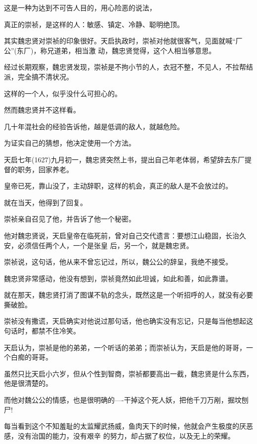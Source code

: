 \documentclass[11pt,a4paper,onecolumn]{article}
\begin{document}
这是一种为达到不可告人目的，用心险恶的说法，

真正的崇祯，是这样的人：敏感、镇定、冷静、聪明绝顶。

其实魏忠贤对崇祯的印象很好。天启执政时，崇祯对他就很客气，见面就喊``厂公''(东厂)，称兄道弟，相当激
动，魏忠贤觉得，这个人相当够意思。

经过长期观察，魏忠贤发现，崇祯是不拘小节的人，衣冠不整，不见人，不拉帮结派，完全搞不清状况。

这样的一个人，似乎没什么可担心的。

然而魏忠贤并不这样看。

几十年混社会的经验告诉他，越是低调的敌人，就越危险。

为证实自己的猜想，他决定使用一个方法。

天启七年(1627)九月初一，魏忠贤突然上书，提出自己年老体弱，希望辞去东厂提督的职务，回家养老。

皇帝已死，靠山没了，主动辞职，这样的机会，真正的敌人是不会放过的。

就在当天，他得到了回复。

崇祯亲自召见了他，并告诉了他一个秘密。

他对魏忠贤说，天启皇帝在临死前，曾对自己交代遗言：要想江山稳固，长治久安，必须信任两个人，一个是张皇
后，另一个，就是魏忠贤。

崇祯说，这句话，他从来不曾忘记过，所以，魏公公的辞呈，我绝不接受。

魏忠贤非常感动，他没有想到，崇祯竟然如此坦诚，如此和善，如此靠谱。

就在那天，魏忠贤打消了图谋不轨的念头，既然这是一个听招呼的人，就没有必要撕破脸。

崇祯没有撒谎，天启确实对他说过那句话，他也确实没有忘记，只是每当他想起这句话时，都禁不住冷笑。

天启认为，崇祯是他的弟弟，一个听话的弟弟；而崇祯认为，天启是他的哥哥，一个白痴的哥哥。

虽然只比天启小六岁，但从个性到智商，崇祯都要高出一截，魏忠贤是什么东西，他是很清楚的。

而他对魏公公的情感，也是很明确的----干掉这个死人妖，把他千刀万剐，掘坟刨尸!

每当看到这个不知羞耻的太监耀武扬威，鱼肉天下的时候，他就会产生极度的厌恶感，没有治国的能力，没有艰辛
的努力，却占据了权位，以及无上的荣耀。

\section[\thesection]{}
\end{document}

